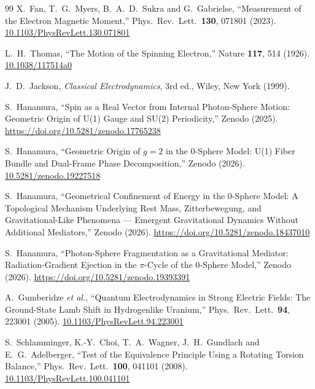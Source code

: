 \documentclass[%
 reprint, amsmath,amssymb, aps, prb, ]{revtex4-2}
\numberwithin{equation}{section}
\begin{document}
\begin{thebibliography}{99}
 X.~Fan, T.~G.~Myers, B.~A.~D.~Sukra and G.~Gabrielse, ``Measurement of the Electron Magnetic Moment,'' Phys.\ Rev.\ Lett.\ \textbf{130}, 071801 (2023). \href{https://doi.org/10.1103/PhysRevLett.130.071801}{10.1103/PhysRevLett.130.071801}

 L.~H.~Thomas, ``The Motion of the Spinning Electron,'' Nature \textbf{117}, 514 (1926). \href{https://doi.org/10.1038/117514a0}{10.1038/117514a0}

 J.~D.~Jackson, \textit{Classical Electrodynamics}, 3rd ed., Wiley, New York (1999).

 S.~Hanamura, ``Spin as a Real Vector from Internal Photon-Sphere Motion: Geometric Origin of U(1) Gauge and SU(2) Periodicity,'' Zenodo (2025). \href{https://doi.org/10.5281/zenodo.17765238}{https://doi.org/10.5281/zenodo.17765238}

 S.~Hanamura, ``Geometric Origin of $g=2$ in the 0-Sphere Model: U(1) Fiber Bundle and Dual-Frame Phase Decomposition,'' Zenodo (2026). \href{https://doi.org/10.5281/zenodo.19227518}{10.5281/zenodo.19227518}

 S.~Hanamura, ``Geometrical Confinement of Energy in the 0-Sphere Model: A Topological Mechanism Underlying Rest Mass, Zitterbewegung, and Gravitational-Like Phenomena --- Emergent Gravitational Dynamics Without Additional Mediators,'' Zenodo (2026). \href{https://doi.org/10.5281/zenodo.18437010}{https://doi.org/10.5281/zenodo.18437010}

 S.~Hanamura, ``Photon-Sphere Fragmentation as a Gravitational Mediator: Radiation-Gradient Ejection in the $\pi$-Cycle of the 0-Sphere Model,'' Zenodo (2026). \href{https://doi.org/10.5281/zenodo.19393391}{https://doi.org/10.5281/zenodo.19393391}

 A.~Gumberidze \textit{et al.}, ``Quantum Electrodynamics in Strong Electric Fields: The Ground-State Lamb Shift in Hydrogenlike Uranium,'' Phys.\ Rev.\ Lett.\ \textbf{94}, 223001 (2005). \href{https://doi.org/10.1103/PhysRevLett.94.223001}{10.1103/PhysRevLett.94.223001}

 S.~Schlamminger, K.-Y.~Choi, T.~A.~Wagner, J.~H.~Gundlach and E.~G.~Adelberger, ``Test of the Equivalence Principle Using a Rotating Torsion Balance,'' Phys.\ Rev.\ Lett.\ \textbf{100}, 041101 (2008). \href{https://doi.org/10.1103/PhysRevLett.100.041101}{10.1103/PhysRevLett.100.041101}


\end{thebibliography}
\end{document}
